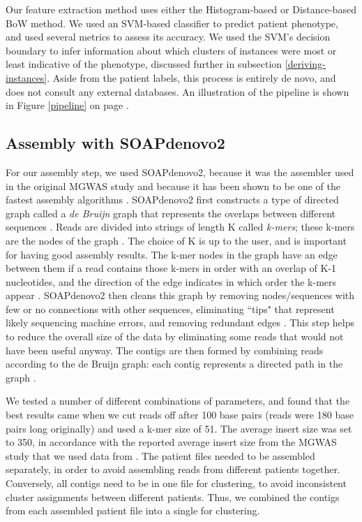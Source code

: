 Our feature extraction method uses either the Histogram-based or Distance-based BoW method. We used an SVM-based classifier to predict patient phenotype, and used several metrics to assess its accuracy. We used the SVM's decision boundary to infer information about which clusters of instances were most or least indicative of the phenotype, discussed further in subsection \ref{deriving-instances}. Aside from the patient labels, this process is entirely de novo, and does not consult any external databases. An illustration of the pipeline is shown in Figure \ref{pipeline} on page \pageref{pipeline}.

\subsection{Assembly with SOAPdenovo2}

For our assembly step, we used SOAPdenovo2, because it was the assembler used in the original MGWAS study \cite{qin041012} and because it has been shown to be one of the fastest assembly algorithms \cite{peng12}. SOAPdenovo2 first constructs a type of directed graph called a \emph{de Bruijn} graph that represents the overlaps between different sequences \cite{li10}. Reads are divided into strings of length K called \emph{k-mers}; these k-mers are the nodes of the graph \cite{zerbino08}. The choice of K is up to the user, and is important for having good assembly results. The k-mer nodes in the graph have an edge between them if a read contains those k-mers in order with an overlap of K-1 nucleotides, and the direction of the edge indicates in which order the k-mers appear \cite{zerbino08}. SOAPdenovo2 then cleans this graph by removing nodes/sequences with few or no connections with other sequences, eliminating ``tips" that represent likely sequencing machine errors, and removing redundant edges \cite{li10}. This step helps to reduce the overall size of the data by eliminating some reads that would not have been useful anyway. The contigs are then formed by combining reads according to the de Bruijn graph: each contig represents a directed path in the graph \cite{zerbino08}. 

We tested a number of different combinations of parameters, and found that the best results came when we cut reads off after 100 base pairs (reads were 180 base pairs long originally) and used a k-mer size of 51. The average insert size was set to 350, in accordance with the reported average insert size from the MGWAS study that we used data from \cite{qin041012}. The patient files needed to be assembled separately, in order to avoid assembling reads from different patients together. Conversely, all contigs need to be in one file for clustering, to avoid inconsistent cluster assignments between different patients. Thus, we combined the contigs from each assembled patient file into a single for clustering.

